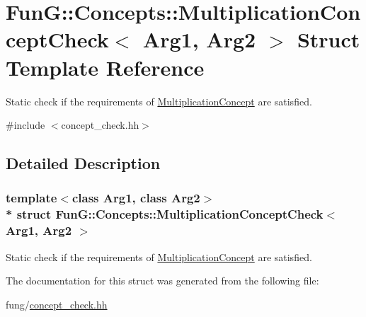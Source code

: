 \hypertarget{structFunG_1_1Concepts_1_1MultiplicationConceptCheck}{}\section{FunG\+:\+:Concepts\+:\+:Multiplication\+Concept\+Check$<$ Arg1, Arg2 $>$ Struct Template Reference}
\label{structFunG_1_1Concepts_1_1MultiplicationConceptCheck}


Static check if the requirements of \hyperlink{structFunG_1_1Concepts_1_1MultiplicationConcept}{Multiplication\+Concept} are satisfied.  




{\ttfamily \#include $<$concept\+\_\+check.\+hh$>$}



\subsection{Detailed Description}
\subsubsection*{template$<$class Arg1, class Arg2$>$\\*
struct Fun\+G\+::\+Concepts\+::\+Multiplication\+Concept\+Check$<$ Arg1, Arg2 $>$}

Static check if the requirements of \hyperlink{structFunG_1_1Concepts_1_1MultiplicationConcept}{Multiplication\+Concept} are satisfied. 

The documentation for this struct was generated from the following file\+:\begin{DoxyCompactItemize}
\item 
fung/\hyperlink{concept__check_8hh}{concept\+\_\+check.\+hh}\end{DoxyCompactItemize}
